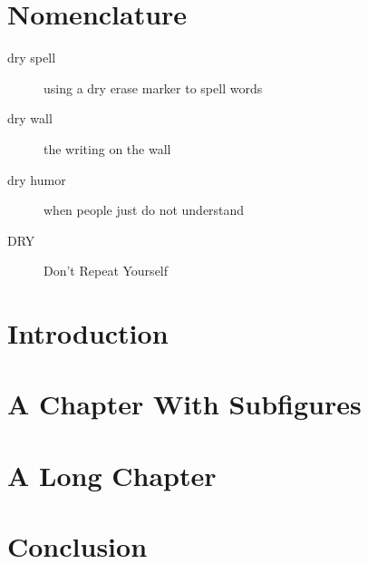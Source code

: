 \documentclass[pdf,ps2pdf,12pt,report,strict,blank]{SANDreport}
\begin{document}
    \chapter*{Nomenclature}
    \begin{description}
	\item[dry spell]
	    using a dry erase marker to spell words
	\item[dry wall]
	    the writing on the wall
	\item[dry humor]
	    when people just do not understand
	\item[DRY]
	    Don't Repeat Yourself
    \end{description}


    \SANDmain		%

    \chapter{Introduction}
	\label{Intro}
	


    \chapter{A Chapter With Subfigures}
	


    \chapter{A Long Chapter}\label{sec:long}
	


    \chapter{Conclusion}
	

    \nocite{*}


    \clearpage
    \providecommand*{\phantomsection}{}
    \phantomsection
    
    


    \appendix
\end{document}

